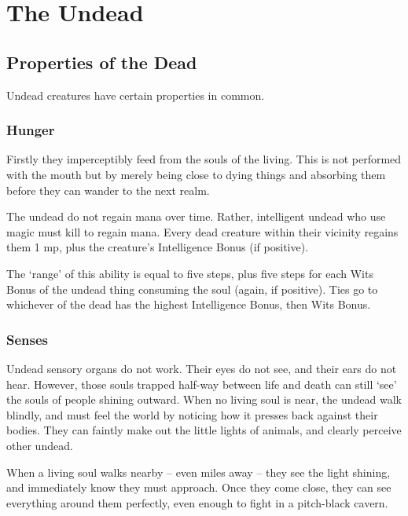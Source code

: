 \chapter[The Undead]{The Undead \D}

\section{Properties of the Dead}
\label{undead}

\noindent
Undead creatures have certain properties in common.

\begin{multicols}{2}

\subsection{Hunger}
Firstly they imperceptibly feed from the souls of the living.
This is not performed with the mouth but by merely being close to dying things and absorbing them before they can wander to the next realm.

The undead do not regain mana over time.
Rather, intelligent undead who use magic must kill to regain mana.
Every dead creature within their vicinity regains them 1 \gls{mp}, plus the creature's Intelligence Bonus (if positive).

The `range' of this ability is equal to five steps, plus five steps for each Wits Bonus of the undead thing consuming the soul (again, if positive).
Ties go to whichever of the dead has the highest Intelligence Bonus, then Wits Bonus.

\subsection[The undead are deaf and blind, but see by the light of living souls]{Senses}
\label{undead_senses}

Undead sensory organs do not work.
Their eyes do not see, and their ears do not hear.
However, those souls trapped half-way between life and death can still `see' the souls of people shining outward.
When no living soul is near, the undead walk blindly, and must feel the world by noticing how it presses back against their bodies.
They can faintly make out the little lights of animals, and clearly perceive other undead.

When a living soul walks nearby -- even miles away -- they see the light shining, and immediately know they must approach.
Once they come close, they can see everything around them perfectly, even enough to fight in a pitch-black cavern.


\end{multicols}
